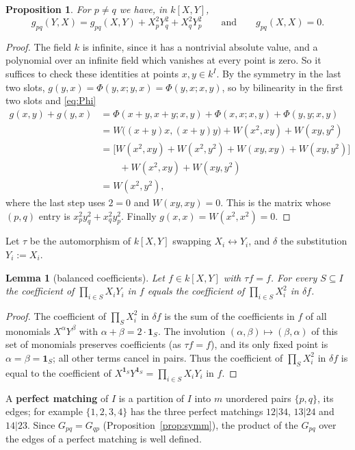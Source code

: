 \documentclass[11pt]{amsart}
\newtheorem{lemma}[theorem]{Lemma}
\newtheorem{proposition}[theorem]{Proposition}
\theoremstyle{remark}
\newcommand{\kk}{k}
\newcommand{\1}{\mathbf{1}}
\begin{document}
\begin{proposition}\label{lem:g}
For $p\neq q$ we have, in $\kk[X,Y]$,
\[
g_{pq}(Y,X)=g_{pq}(X,Y)+X_p^2Y_q^2+X_q^2Y_p^2\qquad\text{and}\qquad g_{pq}(X,X)=0 .
\]
\end{proposition}
\begin{proof}
The field $\kk$ is infinite, since it has a nontrivial absolute value, and a polynomial over an infinite field which
vanishes at every point is zero. So it suffices to check these identities at points $x,y\in\kk^I$. By the symmetry in the last two slots,
$g(y,x)=\Phi(y,x;y,x)=\Phi(y,x;x,y)$, so by bilinearity in the first two slots and \eqref{eq:Phi}
\begin{align*}
g(x,y)+g(y,x)&=\Phi(x+y,x+y;x,y)+\Phi(x,x;x,y)+\Phi(y,y;x,y)\\
&=W\bigl((x+y)x,(x+y)y\bigr)+W(x^2,xy)+W(xy,y^2)\\
&=\bigl[W(x^2,xy)+W(x^2,y^2)+W(xy,xy)+W(xy,y^2)\bigr]\\
&\qquad{}+W(x^2,xy)+W(xy,y^2)\\
&=W(x^2,y^2),
\end{align*}
where the last step uses $2=0$ and $W(xy,xy)=0$. This is the matrix whose $(p,q)$ entry is $x_p^2y_q^2+x_q^2y_p^2$. Finally
$g(x,x)=W(x^2,x^2)=0$.
\end{proof}

Let $\tau$ be the automorphism of $\kk[X,Y]$ swapping $X_i\leftrightarrow Y_i$, and $\delta$ the substitution $Y_i:=X_i$.

\begin{lemma}[balanced coefficients]\label{lem:bal}
Let $f\in\kk[X,Y]$ with $\tau f=f$. For every $S\subseteq I$ the coefficient of
$\prod_{i\in S}X_iY_i$ in $f$ equals the coefficient of $\prod_{i\in S}X_i^2$ in $\delta f$.
\end{lemma}
\begin{proof}
The coefficient of $\prod_{S}X_i^2$ in $\delta f$ is the sum of the coefficients in $f$ of all monomials $X^\alpha Y^\beta$ with
$\alpha+\beta=2\cdot\1_S$. The involution $(\alpha,\beta)\mapsto(\beta,\alpha)$ of this set of monomials preserves coefficients (as
$\tau f=f$), and its only fixed point is $\alpha=\beta=\1_S$; all other terms cancel in pairs. Thus the coefficient of
$\prod_SX_i^2$ in $\delta f$ is equal to the coefficient of $X^{\1_S}Y^{\1_S}=\prod_{i\in S}X_iY_i$ in $f$.
\end{proof}

A \textbf{perfect matching} of $I$ is a partition of $I$ into $m$ unordered pairs $\{p,q\}$, its edges; for example
$\{1,2,3,4\}$ has the three perfect matchings $12|34$, $13|24$ and $14|23$. Since $G_{pq}=G_{qp}$
(Proposition~\ref{prop:symm}), the product of the $G_{pq}$ over the edges of a perfect matching is well defined.
\end{document}
